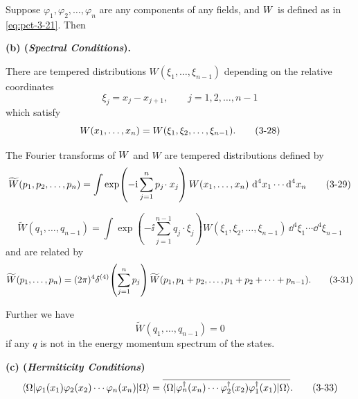 \begin{theorem}\label{thm:ch3-2-translation-invariance}
Suppose $\varphi_1,\varphi_2,\ldots,\varphi_n$ are any components of any
fields, and $W$ is defined as in \eqref{eq:pct-3-21}. Then

\textbf{(b) (\emph{Spectral Conditions}).}\par
There are tempered distributions
$W(\xi_1,\ldots,\xi_{n-1})$ depending on the relative coordinates
\begin{equation}
 \xi_j=x_j-x_{j+1},\qquad j=1,2,\ldots,n-1
 \tag{3-27}\label{eq:pct-3-27}
\end{equation}
which satisfy
\begin{equation}
 W(x_1,\ldots,x_n)=W(\xi_1,\xi_2,\ldots,\xi_{n-1}).
 \tag{3-28}\label{eq:pct-3-28}
\end{equation}

The Fourier transforms of $W$ and $W$ are tempered distributions
defined by
\begin{equation}
 \widetilde{W}(p_1,p_2,\ldots,p_n)
 =\int \exp\!\left(-\mathrm{i}\sum_{j=1}^{n}p_j\!\cdot x_j\right)
 W(x_1,\ldots,x_n)\,\mathop{}\!\mathrm{d}^4x_1\cdots\mathop{}\!\mathrm{d}^4x_n
 \tag{3-29}\label{eq:pct-3-29}
\end{equation}

\begin{equation}
 \widetilde{W}(q_1,\ldots,q_{n-1})
 =\int \exp\!\left(-\ii\sum_{j=1}^{n-1}q_j\!\cdot\xi_j\right)
 W(\xi_1,\xi_2,\ldots,\xi_{n-1})\,\dd^4\xi_1\cdots\dd^4\xi_{n-1}
 \tag{3-30}\label{eq:pct-3-30}
\end{equation}
and are related by
\begin{equation}
 \widetilde{W}(p_1,\ldots,p_n)
 =(2\pi)^4\delta^{(4)}\!\left(\sum_{j=1}^{n}p_j\right)
 \widetilde{W}(p_1,p_1+p_2,\ldots,p_1+p_2+\cdots+p_{n-1}).
 \tag{3-31}\label{eq:pct-3-31}
\end{equation}

Further we have
\begin{equation}
 \widetilde{W}(q_1,\ldots,q_{n-1})=0
 \tag{3-32}\label{eq:pct-3-32}
\end{equation}
if any $q$ is not in the energy momentum spectrum of the states.

\textbf{(c) (\emph{Hermiticity Conditions})}
\begin{equation}
 \langle \Omega\rvert\varphi_1(x_1)\varphi_2(x_2)\cdots\varphi_n(x_n)\lvert \Omega\rangle
 =\overline{\langle \Omega\rvert\varphi_n^\dagger(x_n)\cdots
 \varphi_2^\dagger(x_2)\varphi_1^\dagger(x_1)\lvert \Omega\rangle}.
 \tag{3-33}\label{eq:pct-3-33}
\end{equation}


\end{theorem}
